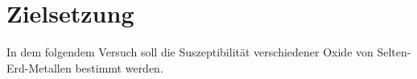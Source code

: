 \section{Zielsetzung}

\label{sec:Zielsetzung}
In dem folgendem Versuch soll die Suszeptibilität verschiedener Oxide von Selten-Erd-Metallen bestimmt werden.
